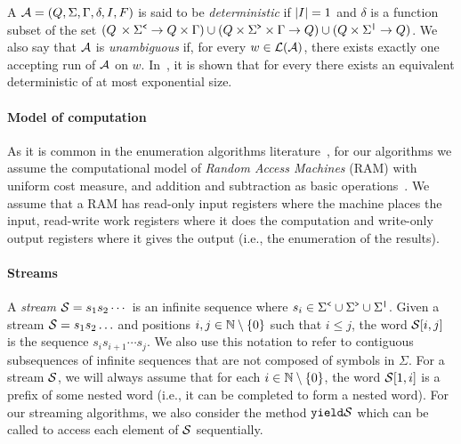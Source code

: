 A \vpa $\mathcal{A} = (Q, \Sigma, \Gamma, \delta, I, F)$ is said to be \emph{deterministic} if $|I| =1$ and $\delta$ is a function subset of the set $(Q\,\times\Sigma^{\texttt{<}} \to Q\times \Gamma) \cup
(Q\times\Sigma^{\texttt{>}}\times\Gamma \to Q)\cup
(Q\times\Sigma^{\texttt{|}} \to Q)$. We also say that $\mathcal{A}$ is \emph{unambiguous} if, for every $w \in \mathcal{L}(\mathcal{A})$, there exists exactly one accepting run of $\mathcal{A}$ on $w$. In~\cite{AlurM04}, it is shown that for every \vpa there exists an equivalent deterministic \vpa of at most exponential size. 

\paragraph{Model of computation} As it is common in the enumeration algorithms literature~\cite{Bagan06,Courcelle09,Segoufin13}, for our algorithms we assume the computational model of \emph{Random Access Machines} (RAM) with uniform cost measure, and addition and subtraction as basic operations~\cite{AhoHU74}. We assume that a RAM has read-only input registers where the machine places the input, read-write work registers where it does the computation and write-only output registers where it gives the output (i.e., the enumeration of the results).

\paragraph{Streams} A {\em stream} $\mathcal{S} = s_1 s_2 \cdots$ is an infinite sequence where $s_i\in \Sigma^{\texttt{<}} \cup \Sigma^{\texttt{>}} \cup \Sigma^{\texttt{|}}$. Given a stream $\mathcal{S} = s_1 s_2 \ldots$ and positions $i,j\in\mathbb{N} \setminus \{0\}$ such that $i \leq j$, the word $\mathcal{S}[i,j]$ is the sequence $s_i s_{i+1} \cdots s_j$. We also use this notation to refer to contiguous subsequences of infinite sequences that are not composed of symbols in $\Sigma$. For a stream $\mathcal{S}$, we will always assume that for each $i \in \mathbb{N} \setminus \{0\}$, the word $\mathcal{S}[1,i]$ is a prefix of some nested word (i.e., it can be completed to form a nested word). For our streaming algorithms, we also consider the method $\texttt{yield}{\mathcal{S}}$ which can be called to access each element of $\mathcal{S}$ sequentially.